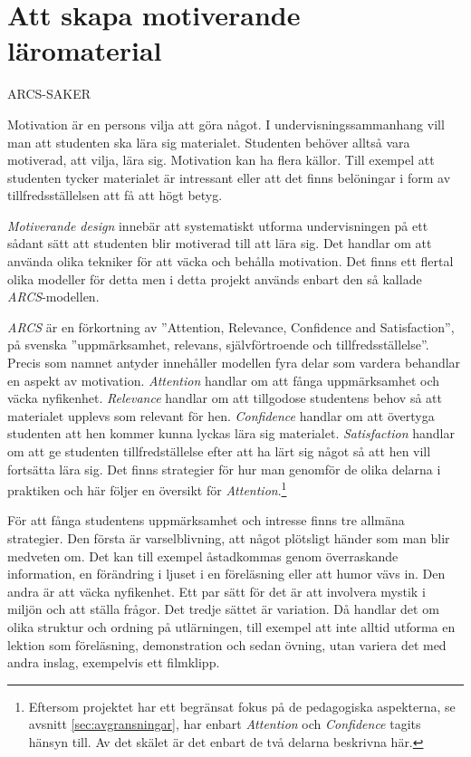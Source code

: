 \section{Att skapa motiverande läromaterial}
\label{sec:arcs}
\begin{binge}
ARCS-SAKER

Motivation är en persons vilja att göra något. I undervisningssammanhang vill man att studenten ska lära sig materialet. Studenten behöver alltså vara motiverad, att vilja, lära sig. Motivation kan ha flera källor. Till exempel att studenten tycker materialet är intressant eller att det finns belöningar i form av tillfredsställelsen att få att högt betyg. 

\textit{Motiverande design} innebär att systematiskt utforma undervisningen på ett sådant sätt att studenten blir motiverad till att lära sig. Det handlar om att använda olika tekniker för att väcka och behålla motivation. Det finns ett flertal olika modeller för detta men i detta projekt används enbart den så kallade \textit{ARCS}-modellen.\cite{arcs_book}

\textit{ARCS} är en förkortning av ''Attention, Relevance, Confidence and Satisfaction'', på svenska ''uppmärksamhet, relevans, självförtroende och tillfredsställelse''. Precis som namnet antyder innehåller modellen fyra delar som vardera behandlar en aspekt av motivation. \textit{Attention} handlar om att fånga uppmärksamhet och väcka nyfikenhet. \textit{Relevance} handlar om att tillgodose studentens behov så att materialet upplevs som relevant för hen. \textit{Confidence} handlar om att övertyga studenten att hen kommer kunna lyckas lära sig materialet. \textit{Satisfaction} handlar om att ge studenten tillfredställelse efter att ha lärt sig något så att hen vill fortsätta lära sig. Det finns strategier för hur man genomför de olika delarna i praktiken och här följer en översikt för \textit{Attention}.\footnote{Eftersom projektet har ett begränsat fokus på de pedagogiska aspekterna, se avsnitt \ref{sec:avgransningar}, har enbart \textit{Attention} och \textit{Confidence} tagits hänsyn till. Av det skälet är det enbart de två delarna beskrivna här.}

För att fånga studentens uppmärksamhet och intresse finns tre allmäna strategier. Den första är varselblivning, att något plötsligt händer som man blir medveten om. Det kan till exempel åstadkommas genom överraskande information, en förändring i ljuset i en föreläsning eller att humor vävs in. Den andra är att väcka nyfikenhet. Ett par sätt för det är att involvera mystik i miljön och att ställa frågor. Det tredje sättet är variation. Då handlar det om olika struktur och ordning på utlärningen, till exempel att inte alltid utforma en lektion som föreläsning, demonstration och sedan övning, utan variera det med andra inslag, exempelvis ett filmklipp.


\end{binge}
